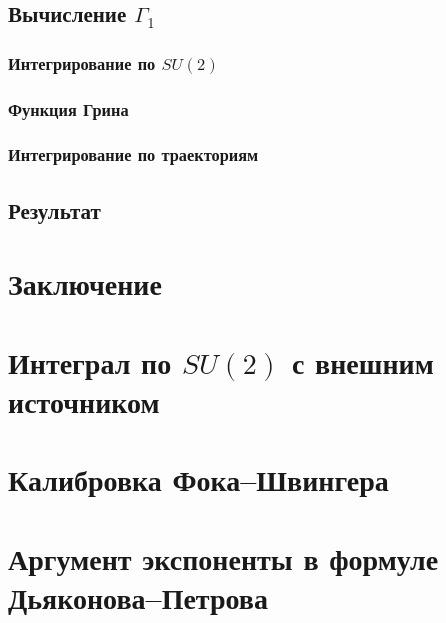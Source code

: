 	\section{Вычисление $\Gamma_1$}
	\label{sec:Gamma1}
	
	
		\subsection{Интегрирование по $SU(2)$}
		\label{sec:SU2Integration}
		
		
		\subsection{Функция Грина}
		\label{sec:GreensFinction}
		
		
		\subsection{Интегрирование по траекториям}
		

	\section{Результат}
	\label{sec:DerivExpanResult}
	

\chapter*{Заключение}
{}


\newpage
\begin{appendix}	
	\chapter{Интеграл по $SU(2)$ с внешним источником}
	\label{sec:Calculation}
	

	\chapter{Калибровка Фока--Швингера}
	\label{sec:FockSchwinger}
	
	
	\chapter{Аргумент экспоненты в формуле Дьяконова--Петрова}
	\label{sec:DPFormula}
	
\end{appendix}



{}

